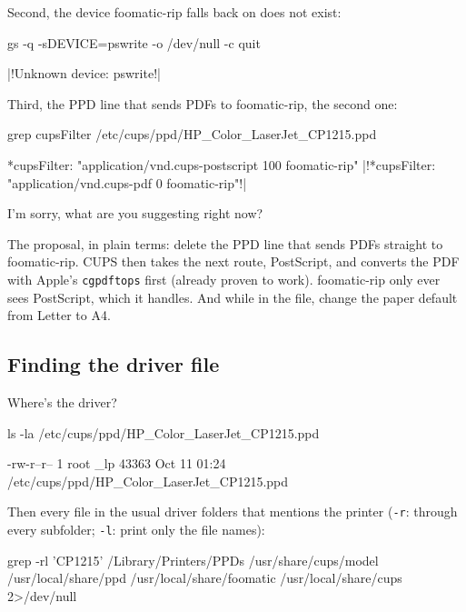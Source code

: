 \documentclass[11pt,a4paper]{article}
\begin{document}
Second, the device foomatic-rip falls back on does not exist:

\begin{pane}
gs -q -sDEVICE=pswrite -o /dev/null -c quit
\end{pane}
\begin{cmdout}
|!Unknown device: pswrite!|
\end{cmdout}

Third, the PPD line that sends PDFs to foomatic-rip, the second one:

\begin{pane}
grep cupsFilter /etc/cups/ppd/HP_Color_LaserJet_CP1215.ppd
\end{pane}
\begin{cmdout}
*cupsFilter:	"application/vnd.cups-postscript 100 foomatic-rip"
|!*cupsFilter:	"application/vnd.cups-pdf 0 foomatic-rip"!|
\end{cmdout}

\begin{alf}
I'm sorry, what are you suggesting right now?
\end{alf}

The proposal, in plain terms: delete the PPD line that sends PDFs straight to foomatic-rip. CUPS then takes the next route, PostScript, and converts the PDF with Apple's \texttt{cgpdftops} first (already proven to work). foomatic-rip only ever sees PostScript, which it handles. And while in the file, change the paper default from Letter to A4.

\subsection{Finding the driver file}\label{sec:driverfile}

\begin{alf}
Where's the driver?
\end{alf}

\begin{pane}
ls -la /etc/cups/ppd/HP_Color_LaserJet_CP1215.ppd
\end{pane}
\begin{cmdout}
-rw-r--r-- 1 root _lp 43363 Oct 11 01:24 /etc/cups/ppd/HP_Color_LaserJet_CP1215.ppd
\end{cmdout}
Then every file in the usual driver folders that mentions the printer (\texttt{-r}: through every subfolder; \texttt{-l}: print only the file names):

\begin{pane}
grep -rl 'CP1215' /Library/Printers/PPDs /usr/share/cups/model /usr/local/share/ppd /usr/local/share/foomatic /usr/local/share/cups 2>/dev/null
\end{pane}
\end{document}
